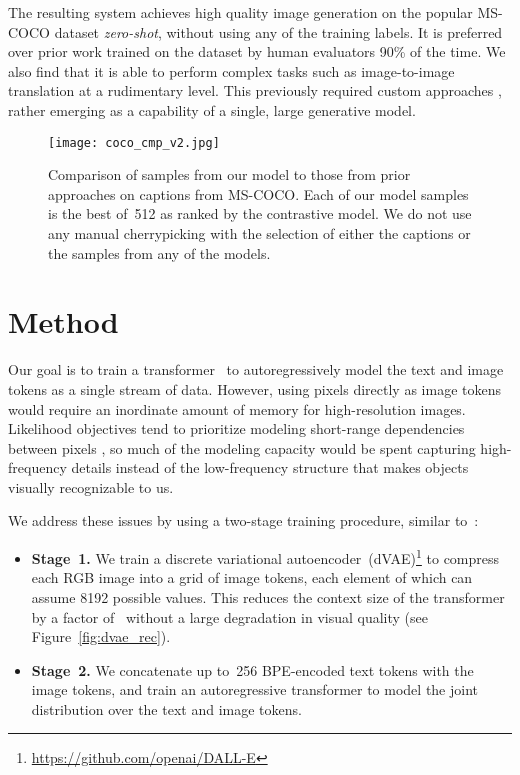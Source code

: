 \documentclass{article}
\begin{document}
The resulting system achieves high quality image generation on the popular MS-COCO dataset \textit{zero-shot}, without using any of the training labels. It is preferred over prior work trained on the dataset by human evaluators 90\% of the time. We also find that it is able to perform complex tasks such as image-to-image translation at a rudimentary level. This previously required custom approaches \citep{isola2017image}, rather
emerging as a capability of a single, large generative model.


\begin{figure*}[t]
    \centering
    \texttt{[image: coco\_cmp\_v2.jpg]}
    \caption{Comparison of samples from our model to those from prior approaches on captions from MS-COCO. Each of our model samples is the best of~512 as ranked by the contrastive model. We do not use any manual cherrypicking with the selection of either the captions or the samples from any of the models.}
    \label{fig:coco_cmp}
\end{figure*}
\section{Method}
Our goal is to train a transformer~\cite{vaswani2017attention} to autoregressively model the text and image tokens as a single stream of data. However, using pixels directly as image tokens would require an inordinate amount of memory for high-resolution images. Likelihood objectives tend to prioritize modeling short-range dependencies between pixels \citep{salimans2017pixelcnn++}, so much of the modeling capacity would be spent capturing high-frequency details instead of the low-frequency structure that makes objects visually recognizable to us.

We address these issues by using a two-stage training procedure, similar to~\cite{oord2017neural,razavi2019generating}:
\begin{itemize}
    \item \textbf{Stage~1.} We train a discrete variational autoencoder~(dVAE)\footnote{\url{https://github.com/openai/DALL-E}} to compress each  RGB image into a  grid of image tokens, each element of which can assume \num{8192} possible values. This reduces the context size of the transformer by a factor of~ without a large degradation in visual quality (see Figure~\ref{fig:dvae_rec}).
    \item \textbf{Stage~2.} We concatenate up to~256 BPE-encoded text tokens with the~ image tokens, and train an autoregressive transformer to model the joint distribution over the text and image tokens.
\end{itemize}
\end{document}
